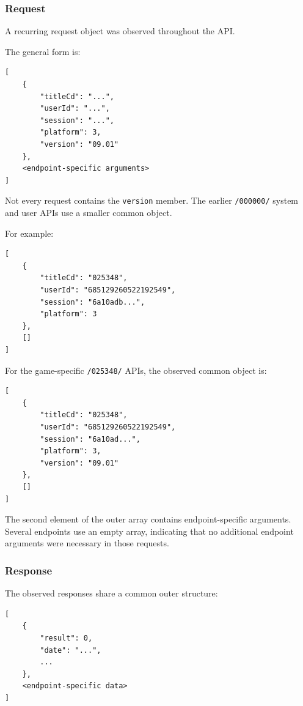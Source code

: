 \newpage

\subsubsection{Request}

A recurring request object was observed throughout the API\@.

The general form is:

\begin{lstlisting}
[
    {
        "titleCd": "...",
        "userId": "...",
        "session": "...",
        "platform": 3,
        "version": "09.01"
    },
    <endpoint-specific arguments>
]
\end{lstlisting}

Not every request contains the \texttt{version} member.  The earlier
\texttt{/000000/} system and user APIs use a smaller common object.

For example:

\begin{lstlisting}
[
    {
        "titleCd": "025348",
        "userId": "685129260522192549",
        "session": "6a10adb...",
        "platform": 3
    },
    []
]
\end{lstlisting}

For the game-specific \texttt{/025348/} APIs, the observed common object is:

\begin{lstlisting}
[
    {
        "titleCd": "025348",
        "userId": "685129260522192549",
        "session": "6a10ad...",
        "platform": 3,
        "version": "09.01"
    },
    []
]
\end{lstlisting}

The second element of the outer array contains endpoint-specific arguments.
Several endpoints use an empty array, indicating that no additional
endpoint arguments were necessary in those requests.

\newpage

\subsubsection{Response}

The observed responses share a common outer structure:

\begin{lstlisting}
[
    {
        "result": 0,
        "date": "...",
        ...
    },
    <endpoint-specific data>
]
\end{lstlisting}

\newpage